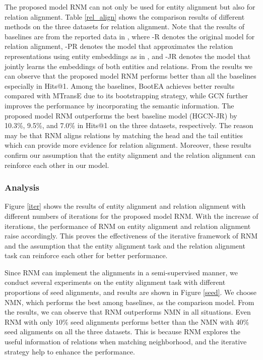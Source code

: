 \documentclass[letterpaper]{article} %
\begin{document}
The proposed model RNM can not only be used for entity alignment but
also for relation alignment. Table \ref{rel_align} shows the
comparison results of different methods on the three datasets for
relation alignment. Note that the results of baselines are from the
reported data in \cite{wu2019jointly}, where -R denotes the original
model for relation alignment, -PR denotes the model that
approximates the relation representations using entity embeddings as
in \cite{wu2019jointly}, and -JR denotes the model that jointly
learns the embeddings of both entities and relations. From the
results we can observe that the proposed model RNM performs better
than all the baselines especially in Hits@1. Among the baselines,
BootEA achieves better results compared with MTransE due to its
bootstrapping strategy, while GCN further improves the performance
by incorporating the semantic information. The proposed model RNM
outperforms the best baseline model (HGCN-JR) by 10.3\%, 9.5\%, and
7.0\% in Hits@1 on the three datasets, respectively. The reason may
be that RNM aligns relations by matching the head and the tail
entities which can provide more evidence for relation alignment.
Moreover, these results confirm our assumption that the entity
alignment and the relation alignment can reinforce each other in our
model.


\subsubsection{Analysis}

Figure \ref{iter} shows the results of entity alignment and relation
alignment with different numbers of iterations for the proposed
model RNM. With the increase of iterations, the performance of RNM
on entity alignment and relation alignment raise accordingly. This
proves the effectiveness of the iterative framework of RNM and the
assumption that the entity alignment task and the relation alignment
task can reinforce each other for better performance.


Since RNM can implement the alignments in a semi-supervised manner,
we conduct several experiments on the entity alignment task with
different proportions of seed alignments, and results are shown in
Figure \ref{seed}. We choose NMN, which performs the best among baselines,
as the comparison model. From the
results, we can observe that RNM outperforms NMN in all situations.
Even RNM with only 10\% seed alignments performs better than the NMN
with 40\% seed alignments on all the three datasets. This is because
RNM explores the useful information of relations when matching
neighborhood, and the iterative
strategy help to enhance the performance.
\end{document}
